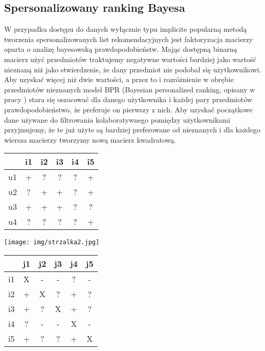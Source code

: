 \documentclass{pracamgr}
\begin{document}
   \subsection{Spersonalizowany ranking Bayesa}
    W przypadku dostępu do danych wyłącznie typu implicite popularną metodą tworzenia spersonalizowanych list rekomendacyjnych jest
    faktoryzacja macierzy oparta o analizę bayesowską prawdopodobieństw.\newline
    Mając dostępną binarną macierz użyć przedmiotów traktujemy negatywne wartości bardziej jako wartość nieznaną niż jako stwierdzenie,
    że dany przedmiot nie podobał się użytkownikowi. Aby uzyskać więcej niż dwie wartości, a przez to i rozróżnienie w obrębie przedmiotów nieznanych
    model BPR (Bayesian personalized ranking, opisany w pracy \cite{BPR}) stara się oszacować dla danego użytkownika i każdej pary przedmiotów prawdopodobieństwo,
    że preferuje on pierwszy z nich. Aby uzyskać początkowe dane używane do filtrowania kolaboratywnego pomiędzy użytkownikami
    przyjmujemy, że te już użyte są bardziej preferowane od nieznanych i dla każdego wiersza macierzy tworzymy nową macierz kwadratową.
     \begin{multicols}{3}
     \begin{tabular}{c|c|c|c|c|c|}
       & i1 & i2 & i3 & i4 & i5 \\
      \hline
      u1 & + & ? & ? & ? & + \\
      \hline
      u2 & ? & + & + & ? & + \\    
      \hline
      u3 & + & + & + & ? & ? \\
      \hline
      u4 & ? & ? & ? & ? & + \\    
     \end{tabular}
     \begin{center}
      \texttt{[image: img/strzalka2.jpg]}\newline
     \end{center}
     \begin{tabular}{c|c|c|c|c|c|}
       & j1 & j2 & j3 & j4 & j5 \\
      \hline
      i1 & X & - & - & ? & - \\
      \hline
      i2 & + & X & ? & + & ? \\    
      \hline
      i3 & + & ? & X & + & ? \\    
      \hline
      i4 & ? & - & - & X & - \\
      \hline
      i5 & + & ? & ? & + & X \\ 
     \end{tabular}
    \end{multicols}
\end{document}
